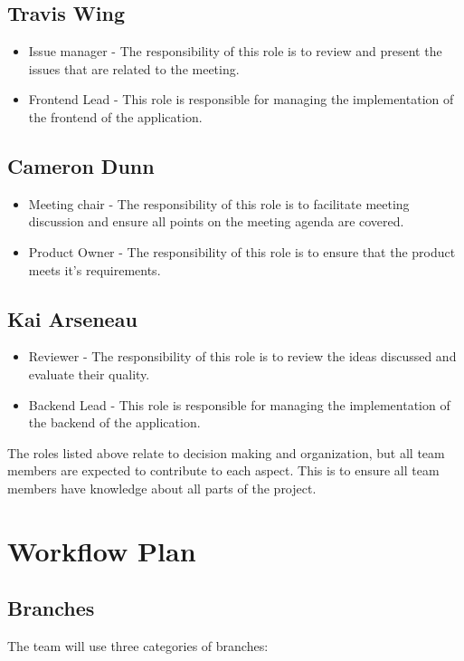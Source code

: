 \documentclass{article}
\begin{document}
\subsection*{Travis Wing}
\begin{itemize}
	\item Issue manager - The responsibility of this role is to review and present the issues that are related to the meeting. 
	\item Frontend Lead - This role is responsible for managing the implementation of the frontend of the application.
\end{itemize}

\subsection*{Cameron Dunn}
\begin{itemize}
	\item Meeting chair - The responsibility of this role is to facilitate meeting discussion and ensure all points on the meeting agenda are covered. 
  \item Product Owner - The responsibility of this role is to ensure that the product meets it's requirements.  
\end{itemize}

\subsection*{Kai Arseneau}
\begin{itemize}
	\item Reviewer - The responsibility of this role is to review the ideas discussed and evaluate their quality.  
	\item Backend Lead - This role is responsible for managing the implementation of the backend of the application.
\end{itemize}

\noindent The roles listed above relate to decision making and organization, but all team members are expected to contribute to each aspect. 
This is to ensure all team members have knowledge about all parts of the project. 


\section{Workflow Plan}

\subsection{Branches}
The team will use three categories of branches: 
\end{document}
